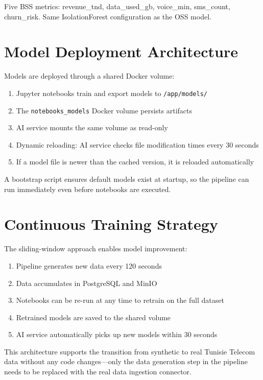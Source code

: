 Five BSS metrics: revenue\_tnd, data\_used\_gb, voice\_min, sms\_count, churn\_risk. Same IsolationForest configuration as the OSS model.

\section{Model Deployment Architecture}

Models are deployed through a shared Docker volume:

\begin{enumerate}
    \item Jupyter notebooks train and export models to \texttt{/app/models/}
    \item The \texttt{notebooks\_models} Docker volume persists artifacts
    \item AI service mounts the same volume as read-only
    \item Dynamic reloading: AI service checks file modification times every 30 seconds
    \item If a model file is newer than the cached version, it is reloaded automatically
\end{enumerate}

A bootstrap script ensures default models exist at startup, so the pipeline can run immediately even before notebooks are executed.

\section{Continuous Training Strategy}

The sliding-window approach enables model improvement:

\begin{enumerate}
    \item Pipeline generates new data every 120 seconds
    \item Data accumulates in PostgreSQL and MinIO
    \item Notebooks can be re-run at any time to retrain on the full dataset
    \item Retrained models are saved to the shared volume
    \item AI service automatically picks up new models within 30 seconds
\end{enumerate}

This architecture supports the transition from synthetic to real Tunisie Telecom data without any code changes---only the data generation step in the pipeline needs to be replaced with the real data ingestion connector.
